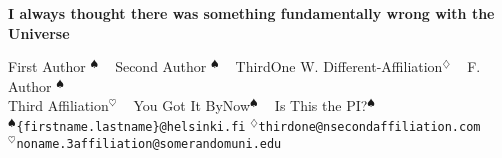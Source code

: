 

\printheader

\begin{center}
\textbf{\bf\veryHuge\color{NavyBlue}I always thought there was something fundamentally wrong with the Universe \\[1.5cm]}


\huge     First Author $^{\spadesuit}$ ~
    Second Author $^{\spadesuit}$ ~ 
    ThirdOne W. Different-Affiliation$^{\diamondsuit}$ ~ 
    F. Author $^{\spadesuit}$ \\[0.2cm] 
    Third Affiliation$^{\heartsuit}$ ~ 
    You Got It ByNow$^{\spadesuit}$ ~
    Is This the PI?$^{\spadesuit}$ \\[0.2cm]
\Large    $^{\spadesuit}$\texttt{\{firstname.lastname\}@helsinki.fi} \qquad $^{\diamondsuit}$\texttt{thirdone@nsecondaffiliation.com} \\
\Large   $^{\heartsuit}$\texttt{noname.3affiliation@somerandomuni.edu} 


\end{center}

\vspace{2cm}






\Large

